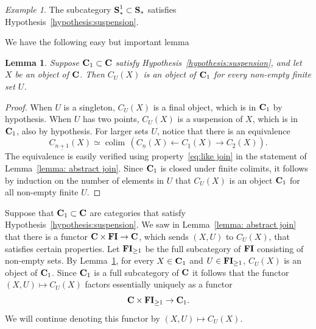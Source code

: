 \documentclass[psamsfonts]{amsart}
\theoremstyle{plain}
\newtheorem{lem}[thm]{Lemma}
\theoremstyle{definition}
\theoremstyle{remark}
\newtheorem{exmp}[thm]{Example}
\newcommand{\catname}[1]{{\normalfont\textbf{#1}}}
\newcommand{\injfin}{\catname{FI}}
\newcommand{\spaces}{\catname{S}_*}
\newcommand{\connected}{\spaces^{1}}
\DeclareMathOperator{\colim}{colim \,}
\begin{document}
\begin{exmp}
The subcategory $\connected\subset \spaces$ satisfies Hypothesis~\ref{hypothesis:suspension}.
\end{exmp}
We have the following easy but important lemma
\begin{lem}\label{lemma:join connected}
Suppose $\catname{C}_1\subset \catname{C}$ satisfy Hypothesis~\ref{hypothesis:suspension}, and let $X$ be an object of $\catname{C}$. Then $C_U(X)$ is an object of $\catname{C}_1$ for every \emph{non-empty} finite set $U$.
\end{lem}
\begin{proof}
When $U$ is a singleton, $C_U(X)$ is a final object, which is in $\catname{C}_1$ by hypothesis. When $U$ has two points, $C_U(X)$ is a suspension of $X$, which is in $\catname{C}_1$, also by hypothesis. For larger sets $U$, notice that there is an equivalence
\[
C_{\underline{n+1}}(X) \simeq \colim\left(C_{\underline{n}}(X) \leftarrow C_{\underline{1}}(X) \rightarrow C_{\underline{2}}(X)\right).
\]
The equivalence is easily verified using property~\eqref{eq:like join} in the statement of Lemma~\ref{lemma: abstract join}. Since $\catname{C}_1$ is closed under finite colimits, it follows by induction on the number of elements in $U$ that $C_U(X)$ is an object $\catname{C}_1$ for all non-empty finite $U$.
\end{proof}
Suppose that $\catname{C}_1\subset \catname{C}$ are categories that satisfy Hypothesis~\ref{hypothesis:suspension}. We saw in Lemma~\ref{lemma: abstract join} that there is a functor $\catname{C}\times \injfin\to \catname{C}$, which sends $(X, U)$ to $C_U(X)$, that satisfies certain properties. Let $\injfin_{\ge 1}$ be the full subcategory of $\injfin$ consisting of non-empty sets. By Lemma~\ref{lemma:join connected}, for every $X\in \catname{C}_1$ and $U\in \injfin_{\ge 1}$, $C_U(X)$ is an object of $\catname{C}_1$. Since $\catname{C}_1$ is a full subcategory of $\catname{C}$ it follows that the functor $(X, U)\mapsto C_U(X)$ factors essentially uniquely as a functor 
\begin{equation}\label{eq: enhanced C_U}
\catname{C}\times \injfin_{\ge 1}\to \catname{C}_1.
\end{equation}
We will continue denoting this functor by $(X, U)\mapsto C_U(X)$.
\end{document}
